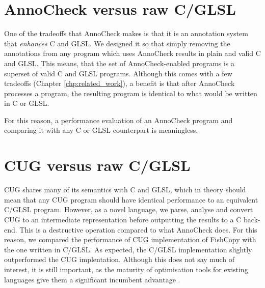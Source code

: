 \documentclass[a4paper,12pt,twoside,openright]{report}
\begin{document}
\section{AnnoCheck versus raw C/GLSL}

One of the tradeoffs that AnnoCheck makes is that it is an annotation system
that \textit{enhances} C and GLSL. We designed it so that simply removing the
annotations from any program which uses AnnoCheck results in plain and valid C
and GLSL. This means, that the set of AnnoCheck-enabled programs is a superset
of valid C and GLSL programs. Although this comes with a few tradeoffs (Chapter
\ref{chp:related_work}), a benefit is that after AnnoCheck processes a program,
the resulting program is identical to what would be written in C or GLSL.

For this reason, a performance evaluation of an AnnoCheck program and comparing
it with any C or GLSL counterpart is meaningless.

\section{CUG versus raw C/GLSL}

CUG shares many of its semantics with C and GLSL, which in theory should mean
that any CUG program should have identical performance to an equivalent C/GLSL
program. However, as a novel language, we parse, analyse and convert CUG to an
intermediate representation before outputting the results to a C back-end. This
is a destructive operation compared to what AnnoCheck does. For this reason, we
compared the performance of CUG implementation of FishCopy with the one written
in C/GLSL. As expected, the C/GLSL implementation slightly outperformed the CUG
implentation. Although this does not say much of interest, it is still
important, as the maturity of optimisation tools for existing languages give
them a significant incumbent advantage \cite{TODO}.




\end{document}

